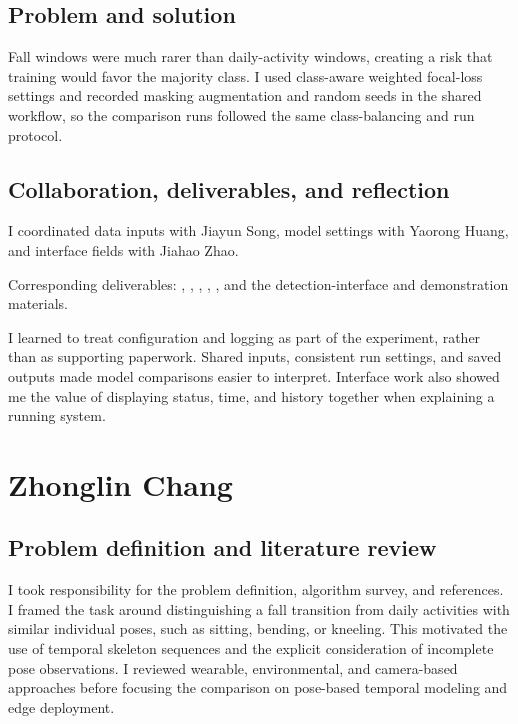 \documentclass[conference,a4paper]{IEEEtran}
\newenvironment{evidence}{\par\smallskip\begingroup\footnotesize\raggedright\noindent}{\par\endgroup}
\begin{document}
\subsection{Problem and solution}

Fall windows were much rarer than daily-activity windows, creating a risk that training would favor the majority class. I used class-aware weighted focal-loss settings and recorded masking augmentation and random seeds in the shared workflow, so the comparison runs followed the same class-balancing and run protocol.

\subsection{Collaboration, deliverables, and reflection}

I coordinated data inputs with Jiayun Song, model settings with Yaorong Huang, and interface fields with Jiahao Zhao. \begin{evidence}
Corresponding deliverables: , , , , , and the detection-interface and demonstration materials.
\end{evidence}

I learned to treat configuration and logging as part of the experiment, rather than as supporting paperwork. Shared inputs, consistent run settings, and saved outputs made model comparisons easier to interpret. Interface work also showed me the value of displaying status, time, and history together when explaining a running system.

\section{Zhonglin Chang}
\subsection{Problem definition and literature review}

I took responsibility for the problem definition, algorithm survey, and references. I framed the task around distinguishing a fall transition from daily activities with similar individual poses, such as sitting, bending, or kneeling. This motivated the use of temporal skeleton sequences and the explicit consideration of incomplete pose observations. I reviewed wearable, environmental, and camera-based approaches before focusing the comparison on pose-based temporal modeling and edge deployment.
\end{document}
